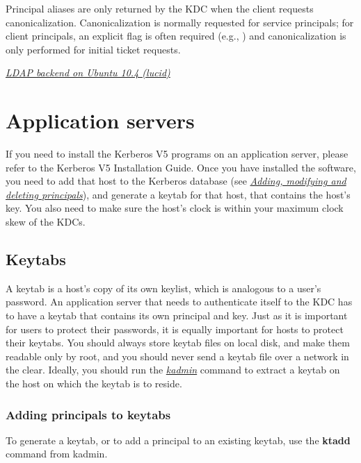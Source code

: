 \documentclass[letterpaper,10pt,english]{sphinxmanual}
\begin{document}
Principal aliases are only returned by the KDC when the client
requests canonicalization.  Canonicalization is normally requested for
service principals; for client principals, an explicit flag is often
required (e.g., ) and canonicalization is only performed
for initial ticket requests.




{\hyperref[admin/advanced/ldapbackend:ldap-be-ubuntu]{\emph{LDAP backend on Ubuntu 10.4 (lucid)}}}




\chapter{Application servers}
\label{admin/appl_servers::doc}\label{admin/appl_servers:application-servers}
If you need to install the Kerberos V5 programs on an application
server, please refer to the Kerberos V5 Installation Guide.  Once you
have installed the software, you need to add that host to the Kerberos
database (see {\hyperref[admin/database:add-mod-del-princs]{\emph{Adding, modifying and deleting principals}}}), and generate a keytab for
that host, that contains the host's key.  You also need to make sure
the host's clock is within your maximum clock skew of the KDCs.


\section{Keytabs}
\label{admin/appl_servers:keytabs}
A keytab is a host's copy of its own keylist, which is analogous to a
user's password.  An application server that needs to authenticate
itself to the KDC has to have a keytab that contains its own principal
and key.  Just as it is important for users to protect their
passwords, it is equally important for hosts to protect their keytabs.
You should always store keytab files on local disk, and make them
readable only by root, and you should never send a keytab file over a
network in the clear.  Ideally, you should run the {\hyperref[admin/admin_commands/kadmin_local:kadmin-1]{\emph{kadmin}}}
command to extract a keytab on the host on which the keytab is to
reside.


\subsection{Adding principals to keytabs}
\label{admin/appl_servers:adding-principals-to-keytabs}\label{admin/appl_servers:add-princ-kt}
To generate a keytab, or to add a principal to an existing keytab, use
the \textbf{ktadd} command from kadmin.
\end{document}
